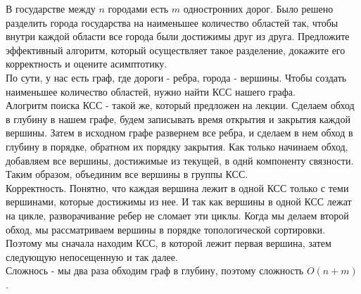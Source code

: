 \documentclass[12pt]{extreport}
\theoremstyle{definiton}
\theoremstyle{definition}
\theoremstyle{definition}
\newcounter{problem}
\newcounter{subproblem}
\newcounter{subrproblem}
\def\prsub{\medskip\noindent\stepcounter{subproblem}\setcounter{subrproblem}{0}{\sf \thesubproblem .}\;}
\begin{document}
	\Pr[1+6] В государстве между $n$ городами есть $m$ одностронних дорог. Было решено разделить города государства на наименьшее количество областей так, чтобы внутри каждой области все города были достижимы друг из друга.
	\prsub Предложите эффективный алгоритм, который осуществляет такое разделение, докажите его корректность и оцените асимптотику.
	\newline
	\\ По сути, у нас есть граф, где дороги - ребра, города - вершины. Чтобы создать наименьшее количество областей, нужно найти КСС нашего графа.
	\\ Алогритм поиска КСС - такой же, который предложен на лекции. Сделаем обход в глубину в нашем графе, будем записывать время открытия и закрытия каждой вершины. Затем в исходном графе развернем все ребра, и сделаем в нем обход в глубину в порядке, обратном их порядку закрытия. Как только начинаем обход, добавляем все вершины, достижимые из текущей, в однй компоненту связности. Таким образом, объединим все вершины в группы КСС.
	\\Корректность. Понятно, что каждая вершина лежит в одной КСС только с теми вершинами, которые достижимы из нее. И так как вершины в одной КСС лежат на цикле, разворачивание ребер не сломает эти циклы. Когда мы делаем второй обход, мы рассматриваем вершины в порядке топологической сортировки. Поэтому мы сначала находим КСС, в которой лежит первая вершина, затем следующую непосещенную и так далее.
	\\Сложнось - мы два раза обходим граф в глубину, поэтому сложность $O(n+m)$.
	
\end{document}
